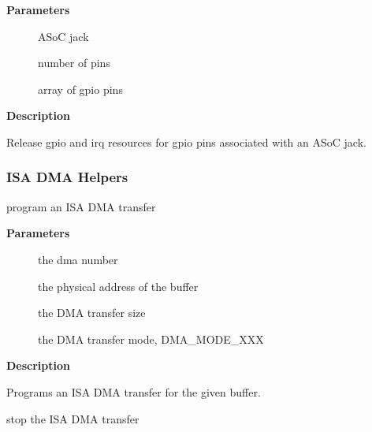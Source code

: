 \documentclass[a4paper,8pt,english]{sphinxmanual}
\begin{document}
\textbf{Parameters}
\begin{description}
\item[{}] \leavevmode
ASoC jack

\item[{}] \leavevmode
number of pins

\item[{}] \leavevmode
array of gpio pins

\end{description}

\textbf{Description}

Release gpio and irq resources for gpio pins associated with an ASoC jack.


\subsubsection{ISA DMA Helpers}
\label{sound/kernel-api/alsa-driver-api:isa-dma-helpers}

\begin{fulllineitems}
\label{sound/kernel-api/alsa-driver-api:c.snd_dma_program}
program an ISA DMA transfer

\end{fulllineitems}


\textbf{Parameters}
\begin{description}
\item[{}] \leavevmode
the dma number

\item[{}] \leavevmode
the physical address of the buffer

\item[{}] \leavevmode
the DMA transfer size

\item[{}] \leavevmode
the DMA transfer mode, DMA\_MODE\_XXX

\end{description}

\textbf{Description}

Programs an ISA DMA transfer for the given buffer.

\begin{fulllineitems}
\label{sound/kernel-api/alsa-driver-api:c.snd_dma_disable}
stop the ISA DMA transfer

\end{fulllineitems}
\end{document}

